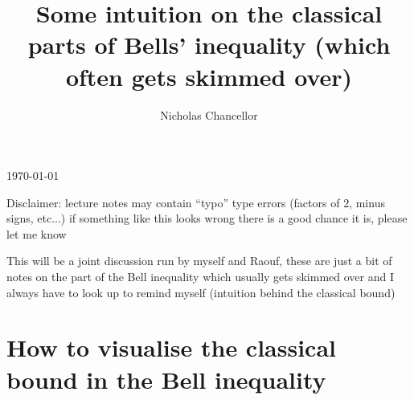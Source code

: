\documentclass[english]{article}
\begin{document}
\title{Some intuition on the classical parts of Bells' inequality (which often gets skimmed over)}
\author{Nicholas Chancellor}


\maketitle


\today %


{\small Disclaimer: lecture notes may contain ``typo'' type errors (factors of $2$, minus signs, etc...) if something like this looks wrong there is a good chance it is, please let me know}

This will be a joint discussion run by myself and Raouf, these are just a bit of notes on the part of the Bell inequality which usually gets skimmed over and I always have to look up to remind myself (intuition behind the classical bound)

\section{How to visualise the classical bound in the Bell inequality}
\end{document}
